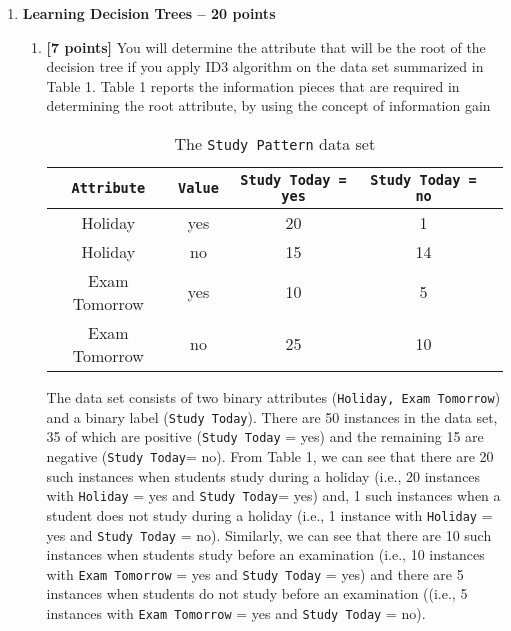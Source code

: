 \begin{enumerate}
\item \textbf{Learning Decision Trees -- 20 points}

  \begin{enumerate}
  \item \textbf{[7 points]} You will determine the attribute that will be the root of the decision tree if you apply ID3 algorithm on the data set summarized in Table 1. Table 1
reports the information pieces that are required in determining the root attribute,
by using the concept of information gain

  \begin{table}[h]
    \centering
    \begin{tabular}[h]{|c|c|c|c|c|}
      \hline
      \texttt{Attribute} & \texttt{Value} & \texttt{Study Today = yes} & \texttt{Study Today = no} \\
      \hline
      Holiday      & yes      & 20   & 1       \\
      Holiday      & no      & 15   & 14        \\
      Exam Tomorrow      & yes      & 10       & 5        \\
      Exam Tomorrow      & no      & 25       & 10        \\
      \hline
    \end{tabular}
    \caption{The {\tt Study Pattern} data set}
    \label{tab:Balloons}
  \end{table}
  
  The data set consists of two binary attributes (\texttt{Holiday, Exam Tomorrow}) and a
binary label (\texttt{Study Today}). There are 50 instances in the data set, 35 of which are positive (\texttt{Study Today} = yes) and the remaining 15 are negative (\texttt{Study Today}= no). From Table 1, we can see that there are 20 such instances when students
study during a holiday (i.e., 20 instances with \texttt{Holiday} = yes and \texttt{Study Today}= yes) and, 1 such instances when a student does not study during a holiday (i.e.,
1 instance with \texttt{Holiday} = yes and \texttt{Study Today} = no). Similarly, we can
see that there are 10 such instances when students study before an examination
(i.e., 10 instances with \texttt{Exam Tomorrow} = yes and \texttt{Study Today} = yes) and there are 5 instances when students do not study before an examination ((i.e., 5
instances with \texttt{Exam Tomorrow} = yes and \texttt{Study Today} = no).


\end{enumerate}
\end{enumerate}
